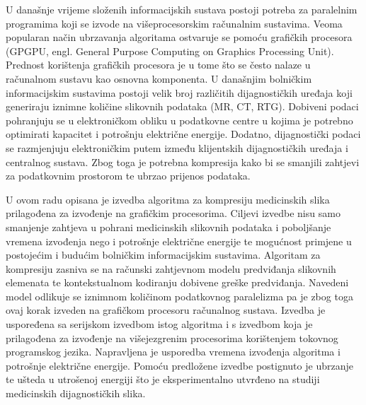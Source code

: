 \documentclass[times, utf8, zavrsni, numeric, sort]{fer}
\begin{document}



\begin{sazetak}
U današnje vrijeme složenih informacijskih sustava postoji potreba za paralelnim programima koji se izvode na višeprocesorskim računalnim sustavima.
Veoma popularan način ubrzavanja algoritama ostvaruje se pomoću grafičkih procesora (GPGPU, engl. General Purpose Computing on Graphics Processing Unit).
Prednost korištenja grafičkih procesora je u tome što se često nalaze u računalnom sustavu kao osnovna komponenta. U današnjim bolničkim
informacijskim sustavima postoji velik broj različitih dijagnostičkih uređaja koji generiraju iznimne količine slikovnih podataka (MR, CT, RTG).
Dobiveni podaci pohranjuju se u elektroničkom obliku u podatkovne centre u kojima je potrebno optimirati kapacitet i potrošnju električne energije.
Dodatno, dijagnostički podaci se razmjenjuju elektroničkim putem između klijentskih dijagnostičkih uređaja i centralnog sustava.
Zbog toga je potrebna kompresija kako bi se smanjili zahtjevi za podatkovnim prostorom te ubrzao prijenos podataka.

U ovom radu opisana je izvedba algoritma za kompresiju medicinskih slika prilagođena za
izvođenje na grafičkim procesorima. Ciljevi izvedbe nisu samo smanjenje zahtjeva u pohrani medicinskih slikovnih podataka i poboljšanje vremena
izvođenja nego i potrošnje električne energije te mogućnost primjene u postojećim i budućim bolničkim informacijskim sustavima. Algoritam za kompresiju
zasniva se na računski zahtjevnom modelu predviđanja slikovnih elemenata te kontekstualnom kodiranju dobivene greške predviđanja. Navedeni model
odlikuje se iznimnom količinom podatkovnog paralelizma pa je zbog toga ovaj korak izveden na grafičkom procesoru računalnog sustava.
Izvedba je uspoređena sa serijskom izvedbom istog algoritma i s izvedbom koja je prilagođena za izvođenje na
višejezgrenim procesorima korištenjem tokovnog programskog jezika. Napravljena je usporedba  vremena izvođenja algoritma i potrošnje električne energije.
Pomoću predložene izvedbe  postignuto je ubrzanje te ušteda u utrošenoj energiji što je eksperimentalno utvrđeno na studiji
medicinskih dijagnostičkih slika.
\pagebreak
{}

\end{sazetak}
\end{document}
